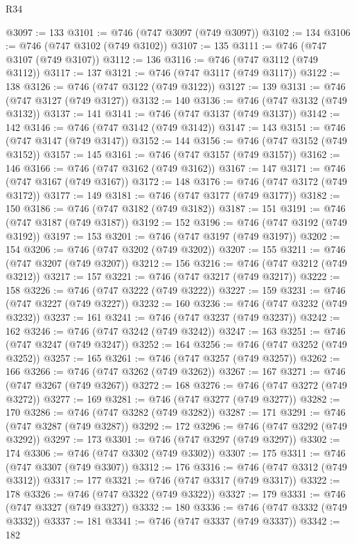 \begin{lexlean}{R34}
\begin{coremodule}
@3097 := 133
@3101 := @746 (@747 @3097 (@749 @3097))
@3102 := 134
@3106 := @746 (@747 @3102 (@749 @3102))
@3107 := 135
@3111 := @746 (@747 @3107 (@749 @3107))
@3112 := 136
@3116 := @746 (@747 @3112 (@749 @3112))
@3117 := 137
@3121 := @746 (@747 @3117 (@749 @3117))
@3122 := 138
@3126 := @746 (@747 @3122 (@749 @3122))
@3127 := 139
@3131 := @746 (@747 @3127 (@749 @3127))
@3132 := 140
@3136 := @746 (@747 @3132 (@749 @3132))
@3137 := 141
@3141 := @746 (@747 @3137 (@749 @3137))
@3142 := 142
@3146 := @746 (@747 @3142 (@749 @3142))
@3147 := 143
@3151 := @746 (@747 @3147 (@749 @3147))
@3152 := 144
@3156 := @746 (@747 @3152 (@749 @3152))
@3157 := 145
@3161 := @746 (@747 @3157 (@749 @3157))
@3162 := 146
@3166 := @746 (@747 @3162 (@749 @3162))
@3167 := 147
@3171 := @746 (@747 @3167 (@749 @3167))
@3172 := 148
@3176 := @746 (@747 @3172 (@749 @3172))
@3177 := 149
@3181 := @746 (@747 @3177 (@749 @3177))
@3182 := 150
@3186 := @746 (@747 @3182 (@749 @3182))
@3187 := 151
@3191 := @746 (@747 @3187 (@749 @3187))
@3192 := 152
@3196 := @746 (@747 @3192 (@749 @3192))
@3197 := 153
@3201 := @746 (@747 @3197 (@749 @3197))
@3202 := 154
@3206 := @746 (@747 @3202 (@749 @3202))
@3207 := 155
@3211 := @746 (@747 @3207 (@749 @3207))
@3212 := 156
@3216 := @746 (@747 @3212 (@749 @3212))
@3217 := 157
@3221 := @746 (@747 @3217 (@749 @3217))
@3222 := 158
@3226 := @746 (@747 @3222 (@749 @3222))
@3227 := 159
@3231 := @746 (@747 @3227 (@749 @3227))
@3232 := 160
@3236 := @746 (@747 @3232 (@749 @3232))
@3237 := 161
@3241 := @746 (@747 @3237 (@749 @3237))
@3242 := 162
@3246 := @746 (@747 @3242 (@749 @3242))
@3247 := 163
@3251 := @746 (@747 @3247 (@749 @3247))
@3252 := 164
@3256 := @746 (@747 @3252 (@749 @3252))
@3257 := 165
@3261 := @746 (@747 @3257 (@749 @3257))
@3262 := 166
@3266 := @746 (@747 @3262 (@749 @3262))
@3267 := 167
@3271 := @746 (@747 @3267 (@749 @3267))
@3272 := 168
@3276 := @746 (@747 @3272 (@749 @3272))
@3277 := 169
@3281 := @746 (@747 @3277 (@749 @3277))
@3282 := 170
@3286 := @746 (@747 @3282 (@749 @3282))
@3287 := 171
@3291 := @746 (@747 @3287 (@749 @3287))
@3292 := 172
@3296 := @746 (@747 @3292 (@749 @3292))
@3297 := 173
@3301 := @746 (@747 @3297 (@749 @3297))
@3302 := 174
@3306 := @746 (@747 @3302 (@749 @3302))
@3307 := 175
@3311 := @746 (@747 @3307 (@749 @3307))
@3312 := 176
@3316 := @746 (@747 @3312 (@749 @3312))
@3317 := 177
@3321 := @746 (@747 @3317 (@749 @3317))
@3322 := 178
@3326 := @746 (@747 @3322 (@749 @3322))
@3327 := 179
@3331 := @746 (@747 @3327 (@749 @3327))
@3332 := 180
@3336 := @746 (@747 @3332 (@749 @3332))
@3337 := 181
@3341 := @746 (@747 @3337 (@749 @3337))
@3342 := 182

\end{coremodule}
\end{lexlean}
